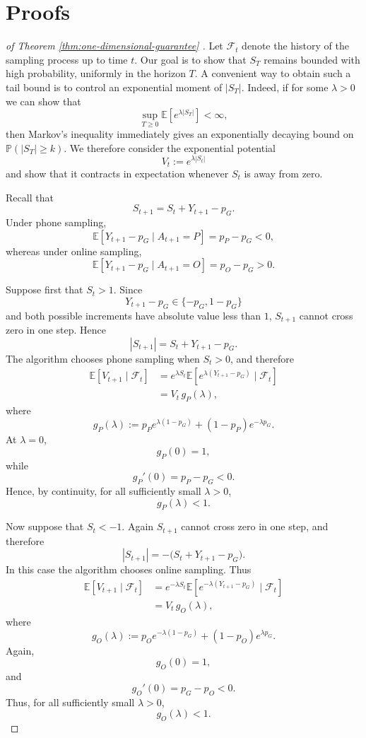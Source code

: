 \documentclass[twoside]{article}
\begin{document}
\section{Proofs}
\begin{proof}[of Theorem \ref{thm:one-dimensional-guarantee} ]
Let \(\mathcal F_t\) denote the history of the sampling process up to time
\(t\). Our goal is to show that \(S_T\) remains bounded with high probability,
uniformly in the horizon \(T\). A convenient way to obtain such a tail bound
is to control an exponential moment of \(|S_T|\). Indeed, if for some
\(\lambda>0\) we can show that
\[
\sup_{T\geq0}
\mathbb E\left[e^{\lambda |S_T|}\right]
<\infty,
\]
then Markov's inequality immediately gives an exponentially decaying bound on
\(\mathbb P(|S_T|\geq k)\). We therefore consider the exponential potential
\[
V_t:=e^{\lambda |S_t|}
\]
and show that it contracts in expectation whenever \(S_t\) is away from zero.

Recall that
\[
S_{t+1}
=
S_t+Y_{t+1}-p_G.
\]
Under phone sampling,
\[
\mathbb E[Y_{t+1}-p_G\mid A_{t+1}=P]
=
p_P-p_G<0,
\]
whereas under online sampling,
\[
\mathbb E[Y_{t+1}-p_G\mid A_{t+1}=O]
=
p_O-p_G>0.
\]

Suppose first that \(S_t>1\). Since
\[
Y_{t+1}-p_G\in\{-p_G,1-p_G\}
\]
and both possible increments have absolute value less than \(1\),
\(S_{t+1}\) cannot cross zero in one step. Hence
\[
|S_{t+1}|
=
S_t+Y_{t+1}-p_G.
\]
The algorithm chooses phone sampling when \(S_t>0\), and therefore
\[
\begin{aligned}
\mathbb E[V_{t+1}\mid\mathcal F_t]
&=
e^{\lambda S_t}
\mathbb E\left[
e^{\lambda(Y_{t+1}-p_G)}
\mid\mathcal F_t
\right] \\
&=
V_t\,g_P(\lambda),
\end{aligned}
\]
where
\[
g_P(\lambda)
:=
p_Pe^{\lambda(1-p_G)}
+
(1-p_P)e^{-\lambda p_G}.
\]
At \(\lambda=0\),
\[
g_P(0)=1,
\]
while
\[
g_P'(0)
=
p_P-p_G<0.
\]
Hence, by continuity, for all sufficiently small \(\lambda>0\),
\[
g_P(\lambda)<1.
\]

Now suppose that \(S_t<-1\). Again \(S_{t+1}\) cannot cross zero in one
step, and therefore
\[
|S_{t+1}|
=
-\bigl(S_t+Y_{t+1}-p_G\bigr).
\]
In this case the algorithm chooses online sampling. Thus
\[
\begin{aligned}
\mathbb E[V_{t+1}\mid\mathcal F_t]
&=
e^{-\lambda S_t}
\mathbb E\left[
e^{-\lambda(Y_{t+1}-p_G)}
\mid\mathcal F_t
\right] \\
&=
V_t\,g_O(\lambda),
\end{aligned}
\]
where
\[
g_O(\lambda)
:=
p_Oe^{-\lambda(1-p_G)}
+
(1-p_O)e^{\lambda p_G}.
\]
Again,
\[
g_O(0)=1,
\]
and
\[
g_O'(0)
=
p_G-p_O<0.
\]
Thus, for all sufficiently small \(\lambda>0\),
\[
g_O(\lambda)<1.
\]


\end{proof}
\end{document}
